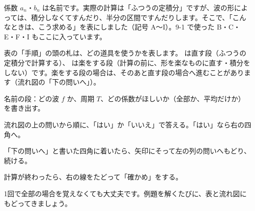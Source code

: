 
\label{bk:9-2:basho}係数 $a_n$・$b_n$ は名前です。実際の計算は「ふつうの定積分」ですが、波の形によっては、積分しなくてすんだり、半分の区間ですんだりします。そこで、「こんなときは、こう求める」を表にしました（記号 A〜I）。9-1 で使った B・C・E・F・I もここに入っています。

表の「手順」の頭の札は、どの道具を使うかを表します。 は直す段（ふつうの定積分で計算する）、 は楽をする段（計算の前に、形を楽なものに直す・積分をしない）です。楽をする段の場合は、そのあと直す段の場合へ進むことがあります（流れ図の「下の問いへ」）。

\begin{enumerate}[label={\bkcircled[\bkTT]{\arabic*}}, leftmargin=2.4\zw, itemsep=1pt, topsep=2pt]
\item 名前の段：どの波 $f$ か、周期 $T$、どの係数がほしいか（全部か、平均だけか）を書き出す。
\item 流れ図の上の問いから順に、「はい」か「いいえ」で答える。「はい」なら右の四角へ。
\item 「下の問いへ」と書いた四角に着いたら、矢印にそって左の列の問いへもどり、続ける。
\item 計算が終わったら、右の線をたどって「確かめ」をする。
\end{enumerate}
1回で全部の場合を覚えなくても大丈夫です。例題を解くたびに、表と流れ図にもどってきましょう。

